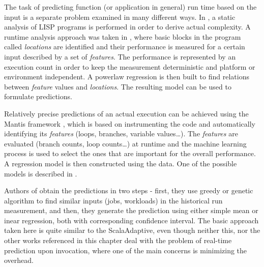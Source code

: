 The task of predicting function (or application in general) run time based on the input is a separate problem examined in many different ways. In \cite{wegbreit_mechanical_1975}, a static analysis of LISP programs is performed in order to derive actual complexity. A runtime analysis approach was taken in \cite{goldsmith_measuring_2007}, where basic blocks in the program called \textit{locations} are identified and their performance is measured for a certain input described by a set of \textit{features}. The performance is represented by an execution count in order to keep the measurement deterministic and platform or environment independent. A powerlaw regression is then built to find relations between \textit{feature} values and \textit{locations}. The resulting model can be used to formulate predictions.

Relatively precise predictions of an actual execution can be achieved using the Mantis framework \cite{chun_mantis:_2010}, which is based on instrumenting the code and automatically identifying its \textit{features} (loops, branches, variable values\dots). The \textit{features} are evaluated (branch counts, loop counts\dots) at runtime and the machine learning process is used to select the ones that are important for the overall performance. A regression model is then constructed using the data. One of the possible models is described in \cite{huang_predicting_2010}.

Authors of \cite{smith_predicting_1998} obtain the predictions in two steps - first, they use greedy or genetic algorithm to find similar inputs (jobs, workloads) in the historical run measurement, and then, they generate the prediction using either simple mean or inear regression, both with corresponding confidence interval. The basic approach taken here is quite similar to the ScalaAdaptive, even though neither this, nor the other works referenced in this chapter deal with the problem of real-time prediction upon invocation, where one of the main concerns is minimizing the overhead.